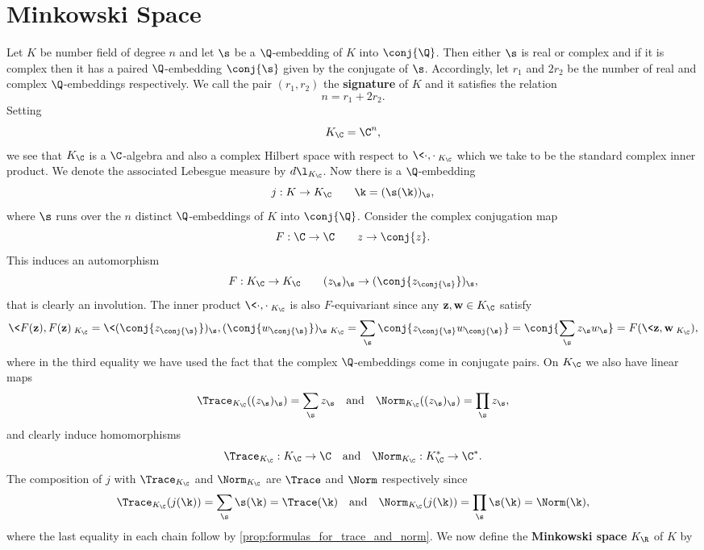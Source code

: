   \section{Minkowski Space}
    Let $K$ be number field of degree $n$ and let $\s$ be a $\Q$-embedding of $K$ into $\conj{\Q}$. Then either $\s$ is real or complex and if it is complex then it has a paired $\Q$-embedding $\conj{\s}$ given by the conjugate of $\s$. Accordingly, let $r_{1}$ and $2r_{2}$ be the number of real and complex $\Q$-embeddings respectively. We call the pair $(r_{1},r_{2})$ the \textbf{signature} of $K$ and it satisfies the relation
    \[
      n = r_{1}+2r_{2}.
    \]
    Setting
    \[
      K_{\C} = \C^{n},
    \]
    we see that $K_{\C}$ is a $\C$-algebra and also a complex Hilbert space with respect to $\<\cdot,\cdot\>_{K_{\C}}$ which we take to be the standard complex inner product. We denote the associated Lebesgue measure by $d\l_{K_{\C}}$. Now there is a $\Q$-embedding
    \[
      j:K \to K_{\C} \qquad \k = (\s(\k))_{\s},
    \]
    where $\s$ runs over the $n$ distinct $\Q$-embeddings of $K$ into $\conj{\Q}$. Consider the complex conjugation map
    \[
      F:\C \to \C \qquad z \to \conj{z}.
    \]
    This induces an automorphism
    \[
      F:K_{\C} \to K_{\C} \qquad (z_{\s})_{\s} \to (\conj{z_{\conj{\s}}})_{\s},
    \]
    that is clearly an involution. The inner product $\<\cdot,\cdot\>_{K_{\C}}$ is also $F$-equivariant since any $\mathbf{z},\mathbf{w} \in K_{\C}$ satisfy
    \[
      \<F(\mathbf{z}),F(\mathbf{z})\>_{K_{\C}} = \<(\conj{z_{\conj{\s}}})_{\s},(\conj{w_{\conj{\s}}})_{\s}\>_{K_{\C}} = \sum_{\s}\conj{z_{\conj{\s}}w_{\conj{\s}}} = \conj{\sum_{\s}z_{\s}w_{\s}} = F(\<\mathbf{z},\mathbf{w}\>_{K_{\C}}),
    \]
    where in the third equality we have used the fact that the complex $\Q$-embeddings come in conjugate pairs. On $K_{\C}$ we also have linear maps
    \[
      \Trace_{K_{\C}}((z_{\s})_{\s}) = \sum_{\s}z_{\s} \quad \text{and} \quad \Norm_{K_{\C}}((z_{\s})_{\s}) = \prod_{\s}z_{\s},
    \]
    and clearly induce homomorphisms
    \[
      \Trace_{K_{\C}}:K_{\C} \to \C \quad \text{and} \quad \Norm_{K_{\C}}:K_{\C}^{\ast} \to \C^{\ast}.
    \]
    The composition of $j$ with $\Trace_{K_{\C}}$ and $\Norm_{K_{\C}}$ are $\Trace$ and $\Norm$ respectively since
    \[
      \Trace_{K_{\C}}(j(\k)) = \sum_{\s}\s(\k) = \Trace(\k) \quad \text{and} \quad \Norm_{K_{\C}}(j(\k)) = \prod_{\s}\s(\k) = \Norm(\k),
    \]
    where the last equality in each chain follow by \cref{prop:formulas_for_trace_and_norm}. We now define the \textbf{Minkowski space} $K_{\R}$ of $K$ by
